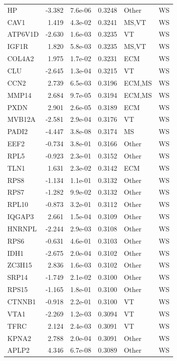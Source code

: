 \begin{table}[ht]
\begin{tabular}{lrlrll}
  HP & -3.382 & 7.6e-06 & 0.3248 & Other & WS \\ 
  CAV1 & 1.419 & 4.3e-02 & 0.3241 & MS,VT & WS \\ 
  ATP6V1D & -2.630 & 1.6e-03 & 0.3235 & VT & WS \\ 
  IGF1R & 1.820 & 5.8e-03 & 0.3235 & MS,VT & WS \\ 
  COL4A2 & 1.975 & 1.7e-02 & 0.3231 & ECM & WS \\ 
  CLU & -2.645 & 1.3e-04 & 0.3215 & VT & WS \\ 
  CCN2 & 2.739 & 6.5e-03 & 0.3196 & ECM,MS & WS \\ 
  MMP14 & 2.684 & 9.7e-05 & 0.3194 & ECM,MS & WS \\ 
  PXDN & 2.901 & 2.6e-05 & 0.3189 & ECM & WS \\ 
  MVB12A & -2.581 & 2.9e-04 & 0.3176 & VT & WS \\ 
  PADI2 & -4.447 & 3.8e-08 & 0.3174 & MS & WS \\ 
  EEF2 & -0.734 & 3.8e-01 & 0.3166 & Other & WS \\ 
  RPL5 & -0.923 & 2.3e-01 & 0.3152 & Other & WS \\ 
  TLN1 & 1.631 & 2.3e-02 & 0.3142 & ECM & WS \\ 
  RPS8 & -1.134 & 1.1e-01 & 0.3132 & Other & WS \\ 
  RPS7 & -1.282 & 9.9e-02 & 0.3132 & Other & WS \\ 
  RPL10 & -0.873 & 3.2e-01 & 0.3112 & Other & WS \\ 
  IQGAP3 & 2.661 & 1.5e-04 & 0.3109 & Other & WS \\ 
  HNRNPL & -2.244 & 2.9e-03 & 0.3108 & Other & WS \\ 
  RPS6 & -0.631 & 4.6e-01 & 0.3103 & Other & WS \\ 
  IDH1 & -2.675 & 2.0e-04 & 0.3102 & Other & WS \\ 
  ZC3H15 & 2.836 & 1.6e-03 & 0.3102 & Other & WS \\ 
  SRP14 & -1.749 & 2.1e-02 & 0.3100 & Other & WS \\ 
  RPS15 & -1.165 & 1.8e-01 & 0.3100 & Other & WS \\ 
  CTNNB1 & -0.918 & 2.2e-01 & 0.3100 & VT & WS \\ 
  VTA1 & -2.269 & 1.2e-03 & 0.3094 & VT & WS \\ 
  TFRC & 2.124 & 2.4e-03 & 0.3091 & VT & WS \\ 
  KPNA2 & 2.788 & 2.0e-04 & 0.3091 & Other & WS \\ 
  APLP2 & 4.346 & 6.7e-08 & 0.3089 & Other & WS \\ 

\end{tabular}
\end{table}
